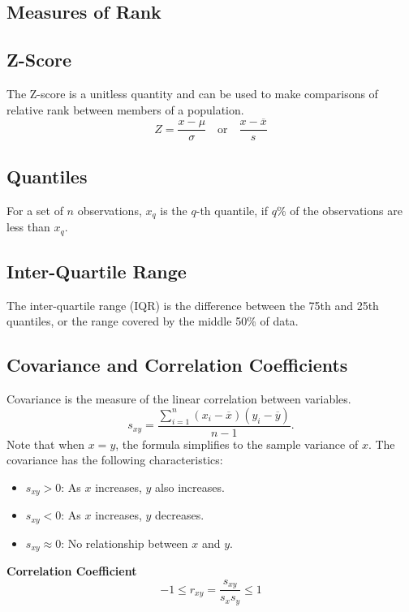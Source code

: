 \documentclass{article}
\begin{document}
\begin{multicols}{3}
\section{Measures of Rank}
\subsection{Z-Score}
The Z-score is a unitless quantity and can be used to make comparisons of relative rank between members of a population.
\begin{equation*}
    Z = \frac{x  - \mu}{\sigma} \quad \text{or} \quad \frac{x - \overline{x}}{s}
\end{equation*}
\subsection{Quantiles}
For a set of \(n\) observations, \(x_q\) is the \(q\)-th quantile, if \(q\)\% of the observations are less than \(x_q\).
\subsection{Inter-Quartile Range}
The inter-quartile range (IQR) is the difference between the 75th and 25th quantiles,
or the range covered by the middle 50\% of data.

\subsection{Covariance and Correlation Coefficients}
Covariance is the measure of the linear correlation between variables.
\begin{equation*}
    s_{xy} = \frac{\sum_{i = 1}^n \left( x_i - \overline{x} \right) \left( y_i - \overline{y} \right)}{n - 1}.
\end{equation*}
Note that when \(x = y\), the formula simplifies to the sample variance of \(x\).
The covariance has the following characteristics:
\begin{itemize}
    \item \(s_{xy} > 0\): As \(x\) increases, \(y\) also increases.
    \item \(s_{xy} < 0\): As \(x\) increases, \(y\) decreases.
    \item \(s_{xy} \approx 0\): No relationship between \(x\) and \(y\).
\end{itemize}
\textbf{Correlation Coefficient}
\begin{equation*}
    -1 \le r_{xy} = \frac{s_{xy}}{s_x s_y} \le 1
\end{equation*}


\end{multicols}
\end{document}
